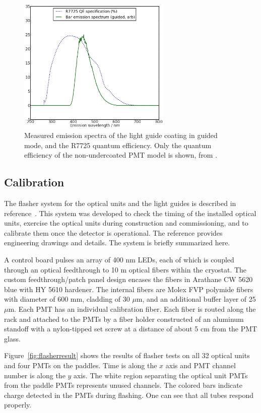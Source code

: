 \begin{figure}
\centering 
\includegraphics[width=0.65\textwidth]{./figures/BarSpectra.png}
\caption{Measured emission spectra of the light guide coating in guided mode, and the R7725 quantum efficiency.  Only the quantum efficiency of the non-undercoated PMT model is shown, from \cite{Hamamatsu-Datasheet2inch}.
 \label{fig:TPBSpectra}  }
\end{figure}

\subsection{Calibration}

The flasher system for the optical units and the light guides is described in reference~\cite{Conrad:2015xta}. This system was developed to check the timing of the installed optical units, exercise the optical units during construction and commissioning, and to calibrate them once the detector is operational.  The reference provides engineering drawings and details.  The system is briefly summarized here.

A control board pulses an array of 400 nm LEDs, each of which is
coupled through an optical feedthrough to 10 m optical fibers within the cryostat.  The custom feedthrough/patch panel design encases the fibers in Arathane CW 5620 blue with HY 5610 hardener.  The internal fibers are Molex FVP polymide fibers with diameter of 600 mm, cladding of 30 $\mu$m, and an additional buffer layer of 25 $\mu$m.  Each PMT has an individual calibration fiber.  Each fiber is routed along the rack  and attached to the PMTs by a fiber holder constructed of an aluminum standoff with a nylon-tipped set screw at a distance of about 5 cm from the PMT glass.

Figure~\ref{fig:flasherresult} shows the results of flasher tests on all 32 optical units and four PMTs on the paddles.  Time is along the $x$ axis and PMT channel number is along the $y$ axis.  The white region separating the optical unit PMTs from the paddle PMTs represents unused channels.  The colored bars indicate charge detected in the PMTs during flashing.  One can see that all tubes respond properly.


